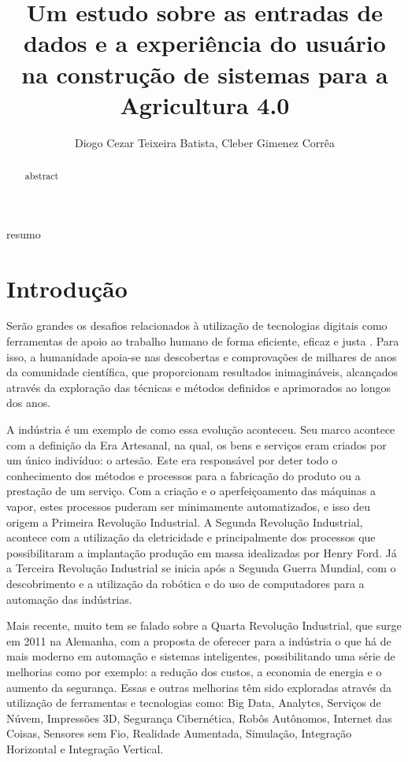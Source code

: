 \documentclass[12pt]{article}
\title{Um estudo sobre as entradas de dados e a experiência do usuário na construção de sistemas para a Agricultura 4.0}
\author{Diogo Cezar Teixeira Batista\inst{1}, Cleber Gimenez Corrêa\inst{1}}
\begin{document}
 

\maketitle

\begin{abstract}
  abstract
\end{abstract}
     
\begin{resumo} 
  resumo
\end{resumo}

\section{Introdução}

Serão grandes os desafios relacionados à utilização de tecnologias digitais como ferramentas de apoio ao trabalho humano de forma eficiente, eficaz e justa \cite{agriculture-40-rose}. Para isso, a humanidade apoia-se nas descobertas e comprovações de milhares de anos da comunidade científica, que proporcionam resultados inimagináveis, alcançados através da exploração das técnicas e métodos definidos e aprimorados ao longos dos anos.

A indústria é um exemplo de como essa evolução aconteceu. Seu marco acontece com a definição da Era Artesanal, na qual, os bens e serviços eram criados por um único indivíduo: o artesão. Este era responsável por deter todo o conhecimento dos métodos e processos para a fabricação do produto ou a prestação de um serviço. Com a criação e o aperfeiçoamento das máquinas a vapor, estes processos puderam ser minimamente automatizados, e isso deu origem a Primeira Revolução Industrial. A Segunda Revolução Industrial, acontece com a utilização da eletricidade e principalmente dos processos que possibilitaram a implantação produção em massa idealizadas por Henry Ford. Já a Terceira Revolução Industrial se inicia após a Segunda Guerra Mundial, com o descobrimento e a utilização da robótica e do uso de computadores para a automação das indústrias. \cite{industria-40}

Mais recente, muito tem se falado sobre a Quarta Revolução Industrial, que surge em 2011 na Alemanha, com a proposta de oferecer para a indústria o que há de mais moderno em automação e sistemas inteligentes, possibilitando uma série de melhorias como por exemplo: a redução dos custos, a economia de energia e o aumento da segurança. Essas e outras melhorias têm sido exploradas através da utilização de ferramentas e tecnologias como: Big Data, Analytcs, Serviços de Núvem, Impressões 3D, Segurança Cibernética, Robôs Autônomos, Internet das Coisas, Sensores sem Fio, Realidade Aumentada, Simulação, Integração Horizontal e Integração Vertical. \cite{industria-40}
\end{document}
